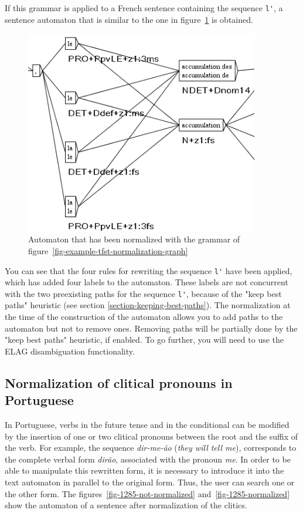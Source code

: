 \bigskip
\noindent If this grammar is applied to a French sentence containing the sequence
\verb+l'+, a sentence automaton that is similar to the one in
figure~\ref{fig-tfst-normalization-results} is obtained.

\begin{figure}[!ht]
\begin{center}
\includegraphics[width=10.2cm]{resources/img/fig7-5.png}
\caption{Automaton that has been normalized with the grammar of 
figure~\ref{fig-example-tfst-normalization-graph}\label{fig-tfst-normalization-results}}
\end{center}
\end{figure}

\bigskip
\noindent You can see that the four rules for rewriting the sequence \verb+l'+
have been applied, which has added four labels to the automaton. These labels are
not concurrent with the two preexisting paths for the sequence \verb+l'+,
because of the "keep best paths" heuristic (see section
\ref{section-keeping-best-paths}). The
normalization at the time of the construction of the automaton allows you to 
add paths to the automaton but not to remove ones. Removing paths will be
partially done by the "keep best paths" heuristic, if enabled. To go further,
you will need to use the ELAG disambiguation functionality.


\subsection{Normalization of clitical pronouns in Portuguese}
\label{section-portuguese-clitics}
In Portuguese, verbs in the future tense and in the conditional can be modified
by the insertion of one or two clitical pronouns between the root and the suffix
of the verb. For example, the sequence \textit{dir-me-\~ao} (\textit{they will
tell me}), corresponds to the complete verbal form \textit{dir\~ao}, associated
with the pronoun \textit{me}. In order to be able to manipulate this rewritten form,
it is necessary to introduce it into the text automaton in parallel to the
original form. Thus, the user can search one or the other form. The 
figures~\ref{fig-1285-not-normalized} and~\ref{fig-1285-normalized}  show the
automaton of a sentence after normalization of the clitics.


